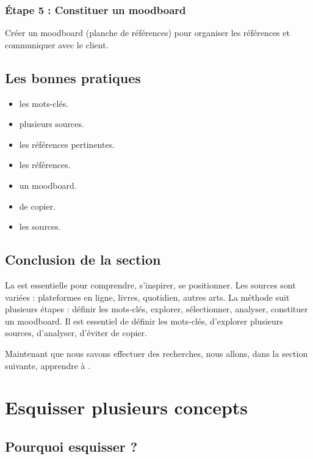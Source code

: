 \subsubsection{Étape 5 : Constituer un moodboard}

Créer un moodboard (planche de références) pour organiser les références et communiquer avec le client.

\subsection{Les bonnes pratiques}

\begin{itemize}
    \item {} les mots-clés.
    \item {} plusieurs sources.
    \item {} les références pertinentes.
    \item {} les références.
    \item {} un moodboard.
    \item {} de copier.
    \item {} les sources.
\end{itemize}

\subsection*{Conclusion de la section}

La  est essentielle pour comprendre, s'inspirer, se positionner. Les sources sont variées : plateformes en ligne, livres, quotidien, autres arts. La méthode suit plusieurs étapes : définir les mots-clés, explorer, sélectionner, analyser, constituer un moodboard. Il est essentiel de définir les mots-clés, d'explorer plusieurs sources, d'analyser, d'éviter de copier.

Maintenant que nous savons effectuer des recherches, nous allons, dans la section suivante, apprendre à .

\section{Esquisser plusieurs concepts}

\subsection{Pourquoi esquisser ?}

